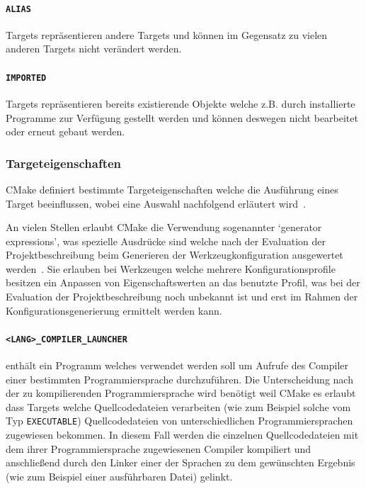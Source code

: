 \documentclass[german,proseminar,hyperref,utf8,lof]{zihpub}
\begin{document}
    \paragraph{\texttt{ALIAS}} Targets repräsentieren andere Targets und können im Gegensatz zu vielen
    anderen Targets nicht verändert werden.

    \paragraph{\texttt{IMPORTED}} Targets repräsentieren bereits existierende Objekte welche z.B. durch
    installierte Programme zur Verfügung gestellt werden und können deswegen nicht bearbeitet
    oder erneut gebaut werden.

    \subsubsection{Targeteigenschaften}
    CMake definiert bestimmte Targeteigenschaften welche die Ausführung eines Target beeinflussen,
    wobei eine Auswahl nachfolgend erläutert wird~.

    An vielen Stellen erlaubt CMake die Verwendung sogenannter `generator expressions', was spezielle
    Ausdrücke sind welche nach der Evaluation der Projektbeschreibung beim Generieren der Werkzeugkonfiguration
    ausgewertet werden~.
    Sie erlauben bei Werkzeugen welche mehrere Konfigurationsprofile besitzen ein Anpassen von
    Eigenschaftswerten an das benutzte Profil, was bei der Evaluation der Projektbeschreibung
    noch unbekannt ist und erst im Rahmen der Konfigurationsgenerierung ermittelt werden kann.

    \paragraph{\texttt{<LANG>\_COMPILER\_LAUNCHER}} enthält ein Programm welches verwendet werden soll um
    Aufrufe des Compiler einer bestimmten Programmiersprache durchzuführen.
    Die Unterscheidung nach der zu kompilierenden Programmiersprache wird benötigt weil CMake es erlaubt
    dass Targets welche Quellcodedateien verarbeiten (wie zum Beispiel solche vom Typ \texttt{EXECUTABLE})
    Quellcodedateien von unterschiedlichen Programmiersprachen zugewiesen bekommen.
    In diesem Fall werden die einzelnen Quellcodedateien mit dem ihrer Programmiersprache zugewiesenen
    Compiler kompiliert und anschlie{\ss}end durch den Linker einer der Sprachen zu dem gewünschten Ergebnis
    (wie zum Beispiel einer ausführbaren Datei) gelinkt.
\end{document}
